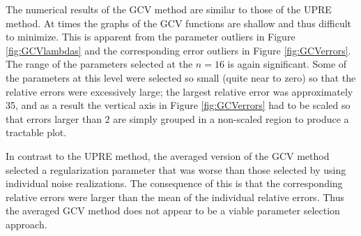 \documentclass[12pt,notitlepage]{report}
\begin{document}
The numerical results of the GCV method are similar to those of the UPRE method. At times the graphs of the GCV functions are shallow and thus difficult to minimize. This is apparent from the parameter outliers in Figure \ref{fig:GCVlambdas} and the corresponding error outliers in Figure \ref{fig:GCVerrors}. The range of the parameters selected at the $n = 16$ is again significant. Some of the parameters at this level were selected so small (quite near to zero) so that the relative errors were excessively large; the largest relative error was approximately 35, and as a result the vertical axis in Figure \ref{fig:GCVerrors} had to be scaled so that errors larger than 2 are simply grouped in a non-scaled region to produce a tractable plot. \par 
In contrast to the UPRE method, the averaged version of the GCV method selected a regularization parameter that was worse than those selected by using individual noise realizations. The consequence of this is that the corresponding relative errors were larger than the mean of the individual relative errors. Thus the averaged GCV method does not appear to be a viable parameter selection approach.
\end{document}
